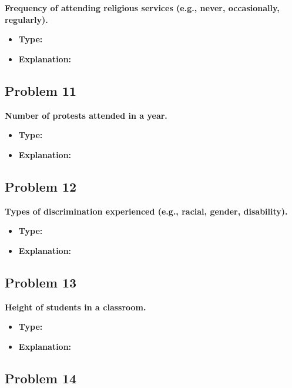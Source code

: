 \documentclass[
  letterpaper,
  DIV=11,
  numbers=noendperiod]{scrreprt}
\begin{document}
\textbf{Frequency of attending religious services (e.g., never,
occasionally, regularly).}

\begin{itemize}
\item
  \textbf{Type:}
\item
  \textbf{Explanation:}
\end{itemize}

\subsection*{Problem 11}\label{problem-11}

\textbf{Number of protests attended in a year.}

\begin{itemize}
\item
  \textbf{Type:}
\item
  \textbf{Explanation:}
\end{itemize}

\subsection*{Problem 12}\label{problem-12}

\textbf{Types of discrimination experienced (e.g., racial, gender,
disability).}

\begin{itemize}
\item
  \textbf{Type:}
\item
  \textbf{Explanation:}
\end{itemize}

\subsection*{Problem 13}\label{problem-13}

\textbf{Height of students in a classroom.}

\begin{itemize}
\item
  \textbf{Type:}
\item
  \textbf{Explanation:}
\end{itemize}

\subsection*{Problem 14}\label{problem-14}
\end{document}
